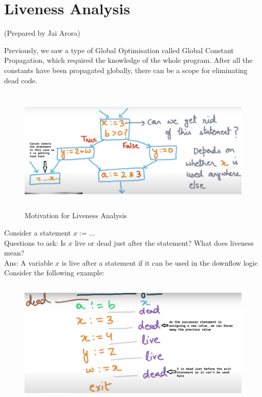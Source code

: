 \setlength{\parindent}{0pt}

\clearpage
\section{Liveness Analysis}
(Prepared by Jai Arora)
\vspace{0.3cm}

Previously, we saw a type of Global Optimisation called Global Constant Propagation, which required the knowledge of the whole program.
After all the constants have been propagated globally, there can be a scope for eliminating dead code.

\begin{figure}[H]
    \centering
    \includegraphics[height=6cm]{images/Module81_1.png}
    \caption{Motivation for Liveness Analysis}
\end{figure}

Consider a statement $x := ...$\\
Questions to ask: Is $x$ live or dead just after the statement? What does liveness mean?\\
Ans: A variable $x$ is live after a statement if it can be used in the downflow logic\\

Consider the following example:
\begin{figure}[H]
    \centering
    \includegraphics[height=6cm]{images/Module81_2.png}
\end{figure}

